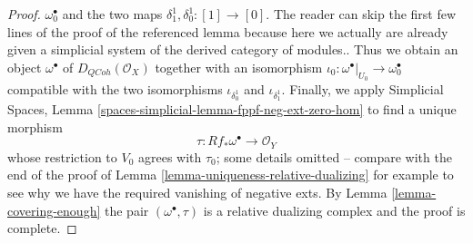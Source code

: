\documentclass[10pt,a4paper]{amsart}
\theoremstyle{plain}
\theoremstyle{definition}
\theoremstyle{remark}
\numberwithin{equation}{subsection}
\def\QCoh{\mathit{QCoh}}
\begin{document}
\begin{proof}
{$\omega_0^\bullet$ and the two maps $\delta_1^1, \delta_0^1 : [1] \to [0]$.
The reader can skip the first few lines of the proof of the
referenced lemma
because here we actually are already given a simplicial system of
the derived category of modules.}.
Thus we obtain an object $\omega^\bullet$ of $D_\QCoh(\mathcal{O}_X)$
together with an isomorphism
$\iota_0 : \omega^\bullet|_{U_0} \to \omega_0^\bullet$
compatible with the two isomorphisms
$\iota_{\delta^1_0}$ and $\iota_{\delta^1_1}$.
Finally, we apply
Simplicial Spaces, Lemma
\ref{spaces-simplicial-lemma-fppf-neg-ext-zero-hom}
to find a unique morphism
$$
\tau : Rf_*\omega^\bullet \longrightarrow \mathcal{O}_Y
$$
whose restriction to $V_0$ agrees with $\tau_0$; some details omitted --
compare with the end of the  proof of
Lemma \ref{lemma-uniqueness-relative-dualizing}
for example to see why we have
the required vanishing of negative exts.
By Lemma \ref{lemma-covering-enough}
the pair $(\omega^\bullet, \tau)$ is a relative dualizing complex
and the proof is complete.
\end{proof}
\end{document}

